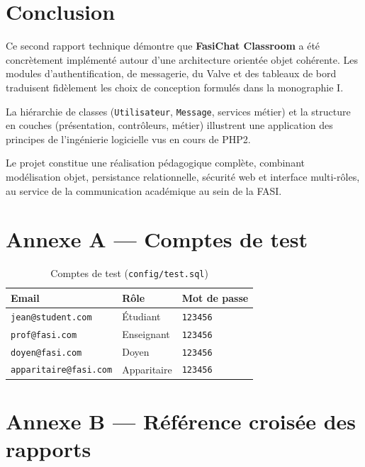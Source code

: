 \documentclass[12pt,a4paper]{article}
\begin{document}
\section{Conclusion}

Ce second rapport technique démontre que \textbf{FasiChat Classroom} a été concrètement implémenté autour d'une architecture orientée objet cohérente. Les modules d'authentification, de messagerie, du Valve et des tableaux de bord traduisent fidèlement les choix de conception formulés dans la monographie I.

La hiérarchie de classes (\texttt{Utilisateur}, \texttt{Message}, services métier) et la structure en couches (présentation, contrôleurs, métier) illustrent une application des principes de l'ingénierie logicielle vus en cours de PHP2.

Le projet constitue une réalisation pédagogique complète, combinant modélisation objet, persistance relationnelle, sécurité web et interface multi-rôles, au service de la communication académique au sein de la FASI.

\appendix
\section{Annexe A --- Comptes de test}

\begin{table}[h]
\centering
\small
\begin{tabular}{|l|l|l|}
\hline
\textbf{Email} & \textbf{Rôle} & \textbf{Mot de passe} \\
\hline
\texttt{jean@student.com} & Étudiant & \texttt{123456} \\
\hline
\texttt{prof@fasi.com} & Enseignant & \texttt{123456} \\
\hline
\texttt{doyen@fasi.com} & Doyen & \texttt{123456} \\
\hline
\texttt{apparitaire@fasi.com} & Apparitaire & \texttt{123456} \\
\hline
\end{tabular}
\caption{Comptes de test (\texttt{config/test.sql})}
\end{table}

\section{Annexe B --- Référence croisée des rapports}
\end{document}

